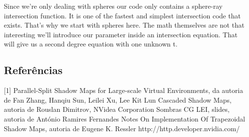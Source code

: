\documentclass[12pt]{article}
\begin{document}
Since we're only dealing with spheres our code only contains a sphere-ray intersection function. It is one of the fastest and simplest intersection code that exists. That's why we start with spheres here. The math themselves are not that interesting we'll introduce our parameter inside an intersection equation. That will give us a second degree equation with one unknown t.

\subsection{Referências}

[1] Parallel-Split Shadow Maps for Large-scale Virtual Environments, da autoria de Fan Zhang, Hanqiu Sun, Leilei Xu, Lee Kit Lun \newline
[2] Cascaded Shadow Maps, autoria de Rouslan Dimitrov, NVidea Corporation \newline
[3] Sombras CG LEI, slides, autoria de António Ramires Fernandes \newline
[4] Notes On Implementation Of Trapezoidal Shadow Maps, autoria de Eugene K. Ressler \newline
[5] http://http.developer.nvidia.com/ \newline
\end{document}
